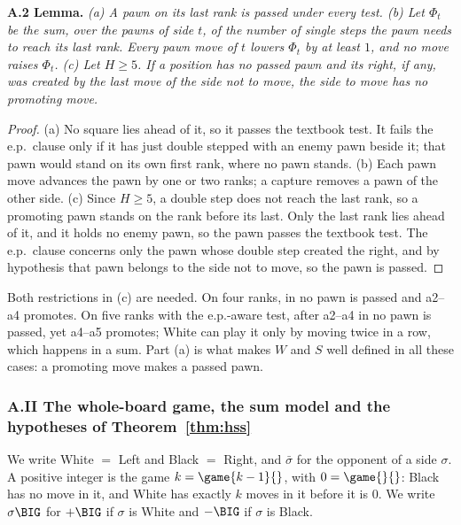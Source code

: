 \textbf{A.2 Lemma.} \emph{(a) A pawn on its last rank is passed under every test. (b) Let $\Phi_t$ be the sum, over the
pawns of side $t$, of the number of single steps the pawn needs to reach its last rank. Every
pawn move of $t$ lowers $\Phi_t$ by at least $1$, and no move raises $\Phi_t$. (c) Let $H\ge5$. If a position has no
passed pawn and its right, if any, was created by the last move of the side not to move, the side to move has no
promoting move.}

\begin{proof}
(a) No square lies ahead of it, so it passes the textbook test. It fails the e.p.\ clause only if it has just double
stepped with an enemy pawn beside it; that pawn would stand on its own first rank, where no pawn stands. (b) Each pawn move
advances the pawn by one or two ranks; a capture removes a pawn of the other side. (c) Since $H\ge5$, a double step
does not reach the last rank, so a promoting pawn stands on the rank before its last. Only the last rank lies ahead of
it, and it holds no enemy pawn, so the pawn passes the textbook test. The e.p.\ clause concerns only the pawn whose double
step created the right, and by hypothesis that pawn belongs to the side not to move, so the pawn is passed.
\end{proof}

\noindent Both restrictions in (c) are needed. On four ranks, in  no pawn is passed and a2--a4
promotes. On five ranks with the e.p.-aware test, after a2--a4 in  no pawn is passed, yet a4--a5
promotes; White can play it only by moving twice in a row, which happens in a sum. Part (a) is what makes $W$ and
$S$ well defined in all these cases: a promoting move makes a passed pawn.

\subsubsection*{A.II The whole-board game, the sum model and the hypotheses of Theorem~\ref{thm:hss}}

We write White $=$ Left and Black $=$ Right, and $\bar\sigma$ for the opponent of a side $\sigma$. A positive integer is
the game $k=\game{k-1}{}$, with $0=\game{}{}$: Black has no move in it, and White has exactly $k$ moves in it before it is
$0$. We write $\sigma\BIG$ for $+\BIG$ if $\sigma$ is White and $-\BIG$ if $\sigma$ is Black.

